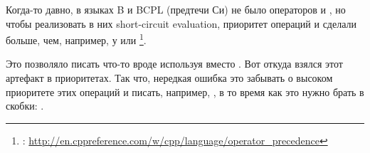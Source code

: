 Когда-то давно\cite{dmr:1995}, в языках B и BCPL (предтечи Си) не было операторов \IT{\&\&} и \IT{||}, 
но чтобы реализовать в них
short-circuit evaluation, приоритет операций \IT{\&} и \IT{|} сделали больше, чем, например, у \IT{\^} или \IT{+}
\footnote{: \url{http://en.cppreference.com/w/cpp/language/operator_precedence}}.

Это позволяло писать что-то вроде  используя \IT{\&} вместо \IT{\&\&}. Вот откуда взялся
этот артефакт в приоритетах.
Так что, нередкая ошибка это забывать о высоком приоритете этих операций и писать, например,
, в то время как это нужно брать в скобки: .

